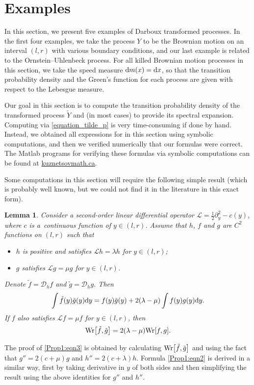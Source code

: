 \documentclass[pdftex]{sigma}
\numberwithin{equation}{section}
\newtheorem{Lemma}[Theorem]{Lemma}
\theoremstyle{definition}
\def\L{{\mathcal L}}
\def\wr{{\textnormal{Wr}}}
\def\d{{\textnormal d}}
\begin{document}
\section{Examples}\label{section_Examples}

In this section, we present five examples of Darboux transformed processes. In the first four examples, we take the process $Y$ to be the Brownian motion on an interval $(l,r)$ with various boundary conditions, and our last example is related to the Ornstein--Uhlenbeck process. For all killed Brownian motion processes in this section, we take the speed measure $\d m(x)=\d x$, so that the transition probability density and the Green's function for each process are given with respect to the Lebesgue measure.

Our goal in this section is to compute the transition probability density of the transformed process $\widetilde Y$ and (in most cases) to provide its spectral expansion. Computing  via \eqref{equation_tilde_p}
is very time-consuming if done by hand. Instead, we obtained all expressions for  in this section using symbolic computations, and then we verified numerically that our formulas were correct. The {\sc Matlab} programs for verifying these formulas via symbolic computations can be found at \href{https://kuznetsovmath.ca/}{kuznetsovmath.ca}.

Some computations in this section will require the following simple result (which is probably well known, but we could not find it in the literature in this exact form).
\begin{Lemma}\label{lemma_Dh}
Consider a second-order linear differential operator $\L=\frac{1}{2} \partial_y^2-c(y)$, where $c$ is a~continuous function of $y\in (l,r)$. Assume that $h$, $f$ and $g$ are $C^2$ functions on $(l,r)$ such that
\begin{itemize}\itemsep=0pt
\item[$(i)$] $h$ is positive and satisfies $\L h=\lambda h$ for $y\in (l,r)$;
\item[$(ii)$] $g$ satisfies $\L g=\mu g$ for $y\in (l,r)$.
\end{itemize}
Denote $\tilde f={\mathcal D}_h f$ and $\tilde g=\mathcal D_h g$. Then
\begin{equation}\label{Prop1:eqn2}
\int \tilde f(y) \tilde g(y) \d y=f(y) \tilde g(y) +2(\lambda-\mu) \int f(y) g(y) \d y.
\end{equation}
If $f$ also satisfies $\L f=\mu f$ for $y\in (l,r)$, then
 \begin{equation}\label{Prop1:eqn3}
\wr\big[\tilde f, \tilde g\big]= 2 (\lambda - \mu) \wr[f,g].
\end{equation}
\end{Lemma}
The proof of \eqref{Prop1:eqn3} is obtained by calculating $\wr\big[\tilde f, \tilde g\big]$ and using the fact that $g''=2(c+\mu) g$ and $h''=2(c+\lambda) h$. Formula \eqref{Prop1:eqn2} is derived in a similar way, first by taking derivative in $y$ of both sides and then simplifying the result using the above identities for $g''$ and $h''$.
\end{document}
